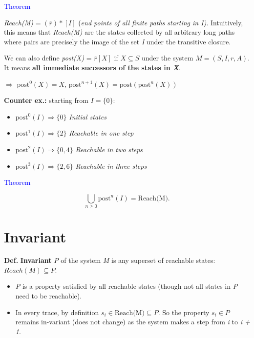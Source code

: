 \documentclass[11pt]{article}
\begin{document}
\textcolor{blue}{Theorem}

\textit{Reach(M)} = $(\bar{r}) * [I]$ (\textit{end points of all finite paths starting in I)}. Intuitively, this means that \textit{Reach(M)} are the states collected by all arbitrary long paths where pairs are precisely the image of the set \textit{I} under the transitive closure. 

We can also define \textit{post(X)} = $\bar{r}[X]$ if $X \subseteq S$ under the system $M = (S, I, r, A)$. It means \textbf{all immediate successors of the states in \textit{X}}.

$\Rightarrow$ $\text{post}^{0}(X) = X, \, \text{post}^{n+1}(X) = \text{post}(\text{post}^{n}(X))$

\textbf{Counter ex.:} starting from $I = \{0\}$: 
\begin{itemize}
	\item $\text{post}^{0}(I) \Rightarrow \{0\}$ \textit{Initial states}
	\item $\text{post}^{1}(I) \Rightarrow \{2\}$ \textit{Reachable in one step}
	\item $\text{post}^{2}(I) \Rightarrow \{0, 4\}$ \textit{Reachable in two steps}
	\item $\text{post}^{3}(I) \Rightarrow \{2,6\}$ \textit{Reachable in three steps}
\end{itemize}


\textcolor{blue}{Theorem}

\[
	\bigcup_{n \geq 0} \text{post}^{n}(I) = \text{Reach(M)}
.\] 

\section*{Invariant}

\begin{tcolorbox}[
    enhanced,
    frame hidden,
    borderline west={2pt}{0pt}{black},
    boxsep=5pt,
    left=8pt
]
\textbf{Def.} \textbf{Invariant} \textit{P} of the system \textit{M} is any superset of reachable states: $Reach(M) \subseteq P$. 
\begin{itemize}
	\item \textit{P} is a property satisfied by all reachable states (though not all states in \textit{P} need to be reachable). 
	\item In every trace, by definition $s_i \in \text{Reach(M)} \subseteq P$. So the property $s_i \in P$ remains in-variant (does not change) as the system makes a step from \textit{i} to \textit{i + 1}. 
\end{itemize}
\end{tcolorbox}
\end{document}
